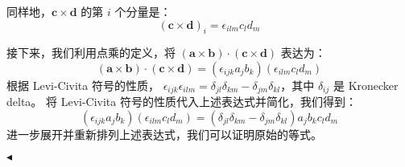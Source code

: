 \documentclass[11pt]{article}
\newenvironment{question}[2][Question]{\begin{trivlist}
\item[\hskip \labelsep {\bfseries #1}\hskip \labelsep {\bfseries #2.}]}{\hfill$\blacktriangleleft$\end{trivlist}}
\begin{document}
\begin{question}{6 (18') (矢量恒等式证明)}
    同样地，\(\mathbf{c} \times \mathbf{d}\) 的第 \(i\) 个分量是：
    \[
    (\mathbf{c} \times \mathbf{d})_i = \epsilon_{ilm}c_ld_m
    \]

    接下来，我们利用点乘的定义，将 \((\mathbf{a} \times \mathbf{b}) \cdot (\mathbf{c} \times \mathbf{d})\) 表达为：
    \[
    (\mathbf{a} \times \mathbf{b}) \cdot (\mathbf{c} \times \mathbf{d}) = (\epsilon_{ijk}a_jb_k)(\epsilon_{ilm}c_ld_m)
    \]
    根据 Levi-Civita 符号的性质， \(\epsilon_{ijk}\epsilon_{ilm} = \delta_{jl}\delta_{km} - \delta_{jm}\delta_{kl}\)，其中 \(\delta_{ij}\) 是 Kronecker delta。
    将 Levi-Civita 符号的性质代入上述表达式并简化，我们得到：
    \[
    (\epsilon_{ijk}a_jb_k)(\epsilon_{ilm}c_ld_m) = (\delta_{jl}\delta_{km} - \delta_{jm}\delta_{kl})a_jb_kc_ld_m
    \]
    进一步展开并重新排列上述表达式，我们可以证明原始的等式。

    \end{question}
    
\end{document}
